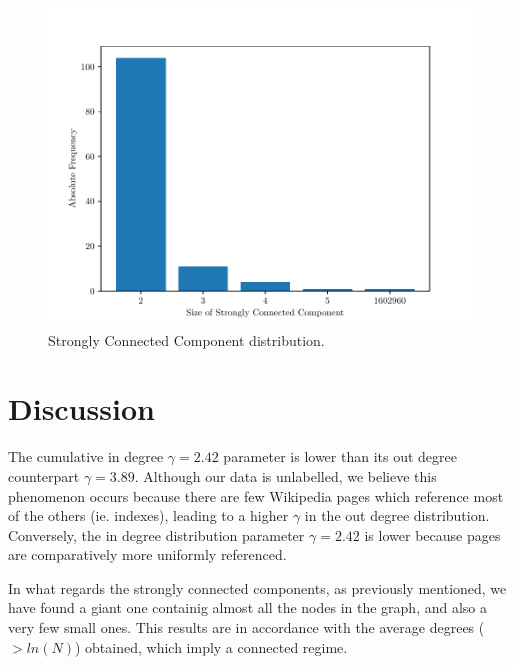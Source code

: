 \documentclass[9pt,a4paper,twocolumn]{article}
\begin{document}
\begin{figure}[h]
	\centering
	\includegraphics[width=\linewidth]{wikipedia_pt_sccdistr.pdf}
	\caption{Strongly Connected Component distribution.}
	\label{fig:sccdist}
\end{figure}



\section{Discussion}

The cumulative in degree $\gamma = 2.42$ parameter is lower than its out degree counterpart $\gamma = 3.89$. Although our data is unlabelled, we believe this phenomenon occurs because there are few Wikipedia pages which reference most of the others (ie. indexes), leading to a higher $\gamma$ in the out degree distribution. Conversely, the in degree distribution parameter $\gamma = 2.42$ is lower because pages are comparatively more uniformly referenced.

In what regards the strongly connected components, as previously mentioned, we have found a giant one containig almost all the nodes in the graph, and also a very few small ones. This results are in accordance with the average degrees ($> ln(N)$) obtained, which imply a connected regime.







\end{document}
